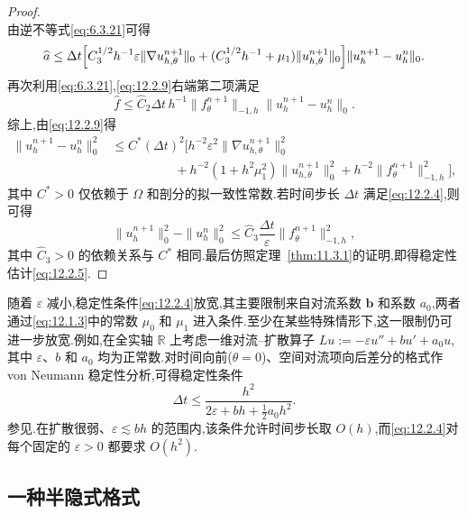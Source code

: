 \begin{proof}
\[\]
由逆不等式\eqref{eq:6.3.21}可得
\[
  \widehat a\le
  \Delta t\Bigl[C_3^{1/2}h^{-1}\varepsilon\|\nabla u_{h,\theta}^{n+1}\|_0
  +(C_3^{1/2}h^{-1}+\mu_1)\|u_{h,\theta}^{n+1}\|_0\Bigr]\|u_h^{n+1}-u_h^n\|_0.
\]
再次利用\eqref{eq:6.3.21},\eqref{eq:12.2.9}右端第二项满足
\[
  \widehat f\le\widehat C_2\Delta t\,h^{-1}\|f_\theta^{n+1}\|_{-1,h}
    \|u_h^{n+1}-u_h^n\|_0.
\]
综上,由\eqref{eq:12.2.9}得
\begin{equation}\label{eq:12.2.10}
  \begin{aligned}
    \|u_h^{n+1}-u_h^n\|_0^2
      &\le C^*(\Delta t)^2\bigl[h^{-2}\varepsilon^2
         \|\nabla u_{h,\theta}^{n+1}\|_0^2\\
      &\hspace{5em}+h^{-2}(1+h^2\mu_1^2)\|u_{h,\theta}^{n+1}\|_0^2
        +h^{-2}\|f_\theta^{n+1}\|_{-1,h}^2\bigr],
  \end{aligned}
\end{equation}
其中 \(C^*>0\) 仅依赖于 \(\Omega\) 和剖分的拟一致性常数.若时间步长 \(\Delta t\) 满足\eqref{eq:12.2.4},则可得
\[
  \|u_h^{n+1}\|_0^2-\|u_h^n\|_0^2
    \le\widehat C_3\frac{\Delta t}{\varepsilon}\|f_\theta^{n+1}\|_{-1,h}^2,
\]
其中 \(\widehat C_3>0\) 的依赖关系与 \(C^*\) 相同.最后仿照定理~\ref{thm:11.3.1}的证明,即得稳定性估计\eqref{eq:12.2.5}.
\end{proof}

随着 \(\varepsilon\) 减小,稳定性条件\eqref{eq:12.2.4}放宽,其主要限制来自对流系数 \(\boldsymbol{b}\) 和系数 \(a_0\),两者通过\eqref{eq:12.1.3}中的常数 \(\mu_0\) 和 \(\mu_1\) 进入条件.至少在某些特殊情形下,这一限制仍可进一步放宽.例如,在全实轴 \(\mathbb R\) 上考虑一维对流--扩散算子 \(Lu:=-\varepsilon u''+bu'+a_0u\),其中 \(\varepsilon\)、\(b\) 和 \(a_0\) 均为正常数.对时间向前(\(\theta=0\))、空间对流项向后差分的格式作 von Neumann 稳定性分析,可得稳定性条件
\[
  \Delta t\le\frac{h^2}{2\varepsilon+bh+\tfrac12 a_0h^2}.
\]
参见.在扩散很弱、\(\varepsilon\lesssim bh\) 的范围内,该条件允许时间步长取 \(O(h)\),而\eqref{eq:12.2.4}对每个固定的 \(\varepsilon>0\) 都要求 \(O(h^2)\).

\subsection{一种半隐式格式}\label{sec:12.2.2}

